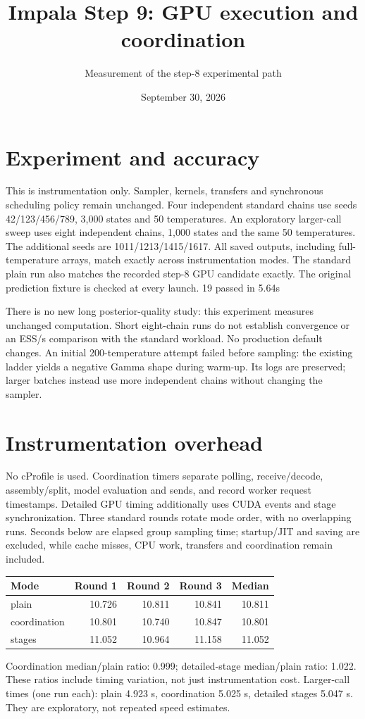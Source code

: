 \documentclass[11pt]{article}
\title{Impala Step 9: GPU execution and coordination}
\author{Measurement of the step-8 experimental path}
\date{September 30, 2026}
\begin{document}
\maketitle
\section*{Experiment and accuracy}
This is instrumentation only. Sampler, kernels, transfers and synchronous
scheduling policy remain unchanged. Four independent standard chains use seeds
42/123/456/789, 3,000 states and 50 temperatures. An exploratory larger-call
sweep uses eight independent chains, 1,000 states and the same 50 temperatures.
The additional seeds are 1011/1213/1415/1617. All saved outputs,
including full-temperature arrays, match exactly across instrumentation modes.
The standard plain run also matches the recorded step-8 GPU candidate exactly.
The original prediction fixture is checked at every launch. 19 passed in 5.64s

There is no new long posterior-quality study: this experiment measures unchanged
computation. Short eight-chain runs do not establish convergence or an
ESS/s comparison with the standard workload. No production default changes.
An initial 200-temperature attempt failed before sampling: the existing ladder
yields a negative Gamma shape during warm-up. Its logs are preserved; larger
batches instead use more independent chains without changing the sampler.
\section*{Instrumentation overhead}
No cProfile is used. Coordination timers separate polling, receive/decode,
assembly/split, model evaluation and sends, and record worker request timestamps.
Detailed GPU timing additionally uses CUDA events and stage synchronization.
Three standard rounds rotate mode order, with no overlapping runs. Seconds below
are elapsed group sampling time; startup/JIT and saving are excluded, while cache
misses, CPU work, transfers and coordination remain included.
\begin{center}\begin{tabular}{lrrrr}\toprule
Mode & Round 1 & Round 2 & Round 3 & Median\\\midrule
plain & 10.726 & 10.811 & 10.841 & 10.811\\
coordination & 10.801 & 10.740 & 10.847 & 10.801\\
stages & 11.052 & 10.964 & 11.158 & 11.052\\
\bottomrule\end{tabular}\end{center}
Coordination median/plain ratio: 0.999; detailed-stage median/plain ratio:
1.022. These ratios include timing variation, not just instrumentation cost.
Larger-call times (one run each): plain 4.923 s, coordination 5.025 s,
detailed stages 5.047 s. They are exploratory, not repeated speed estimates.
\end{document}

